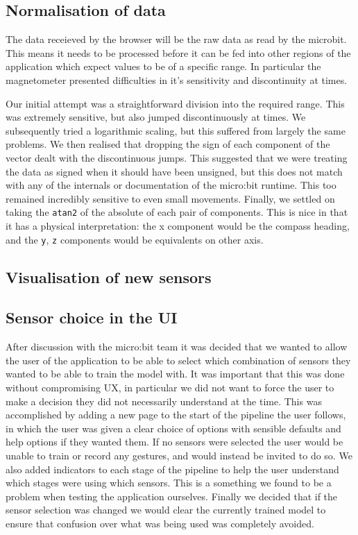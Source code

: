 \documentclass{article}
\begin{document}
\subsection{Normalisation of data}%
\label{subsec:datanorm}
The data receieved by the browser will be the raw data as read by the microbit. This means it needs to be processed before it can be fed into other regions of the application which expect values to be of a specific range. In particular the magnetometer presented difficulties in it's sensitivity and discontinuity at times.

Our initial attempt was a straightforward division into the required range. This was extremely sensitive, but also jumped discontinuously at times. We subsequently tried a logarithmic scaling, but this suffered from largely the same problems. We then realised that dropping the sign of each component of the vector dealt with the discontinuous jumps. This suggested that we were treating the data as signed when it should have been unsigned, but this does not match with any of the internals or documentation of the micro:bit runtime. This too remained incredibly sensitive to even small movements. Finally, we settled on taking the \verb|atan2| of the absolute of each pair of components. This is nice in that it has a physical interpretation: the x component would be the compass heading, and the \verb|y|, \verb|z| components would be equivalents on other axis.

\subsection{Visualisation of new sensors}%
\label{subsec:sensorvis}

\subsection{Sensor choice in the UI}%
\label{subsec:sensorchoice}
After discussion with the micro:bit team it was decided that we wanted to allow the user of the application to be able to select which combination of sensors they wanted to be able to train the model with. It was important that this was done without compromising UX, in particular we did not want to force the user to make a decision they did not necessarily understand at the time. This was accomplished by adding a new page to the start of the pipeline the user follows, in which the user was given a clear choice of options with sensible defaults and help options if they wanted them. If no sensors were selected the user would be unable to train or record any gestures, and would instead be invited to do so. We also added indicators to each stage of the pipeline to help the user understand which stages were using which sensors. This is a something we found to be a problem when testing the application ourselves. Finally we decided that if the sensor selection was changed we would clear the currently trained model to ensure that confusion over what was being used was completely avoided.
\end{document}
